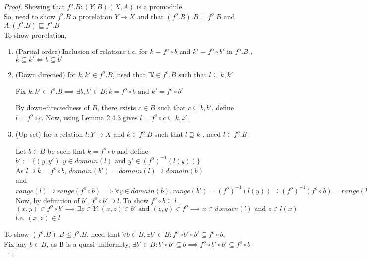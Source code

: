\documentclass[18pt,a4paper]{article}
\makeatletter
\theoremstyle{definition}
\newcommand{\carrow}{}%
\DeclareRobustCommand{\carrow}{%
	\mathrel{\vphantom{\rightarrow}\mathpalette\circle@arrow\relax}%
}
\newcommand{\circle@arrow}[2]{%
	\m@th
	\ooalign{%
		\hidewidth$#1\circ\mkern1mu$\hidewidth\cr
	$#1\longrightarrow$\cr}%
}
\makeatother
\begin{document}
\begin{proof}
Showing that $f^o .B: (Y,B) \carrow (X,A)$ is a promodule.\\
	So, need to show $f^o .B$ a prorelation $Y \to X$
	and that $(f^o .B).B \sqsubseteq f^o .B$ and $A.(f^o .B) \sqsubseteq f^o .B$ \\
	To show prorelation, \begin{enumerate}[label=(\roman*)]
		\item (Partial-order) Inclusion of relations i.e. for $k=f^o \circ b$ and
			$k'=f^o \circ b'$ in $f^o .B$ , $k \subseteq k' \iff b \subseteq b'$
		\item (Down directed) for $k,k' \in f^o .B$, need that $\exists l \in f^o .B
			\text{ such that } l \subseteq k,k'$

			Fix $k,k' \in f^o .B \implies \exists b,b' \in B : k=f^o \circ b \text{ and }
			k' = f^o \circ b'$

			By down-directedness of $B$, there exists $c \in B$ such that
			$ c \subseteq b,b'$, define $l=f^o \circ c$.
			Now, using Lemma 2.4.3 gives  $l= f^o \circ c \subseteq k,k'$.
		\item (Up-set) for a relation $l:Y \to X$ and $k \in f^o .B$ such that $l \supseteq k$
			, need $l \in f^o .B$

			Let $b\in B$ be such that $k=f^o \circ b$ and define
			$b':=\{(y,y'): y \in domain(l) \text{ and } y' \in (f^o)^{-1}(l(y))\}$\\
				As $l\supseteq k=f^o \circ b$, $domain(b')=domain(l)\supseteq domain(b)$
				\\ and $range(l) \supseteq range(f^o \circ b)\implies
				\forall y \in domain(b), range (b')=(f^o )^{-1}(l(y)) \supseteq (f^o)^{-1}(f^o \circ b ) = range(b)$\\
				Now, by definition of $b'$, $f^o \circ b' \supseteq l$. To show
				$f^o \circ b \subseteq l$ , \\
				$(x,y)\in f^o \circ b' \implies \exists z \in Y: (x,z)\in b' \text{ and }
				(z,y) \in f^o \implies x \in domain(l) \text{ and } z \in l(x)$ i.e.
				$(x,z) \in l$

		\end{enumerate}
	\item	To show $(f^o .B).B \leq f^o .B$, need that $\forall b \in B,
		\exists b' \in B : f^o \circ b' \circ b' \subseteq f^o \circ b$,\\
		Fix any $b \in B$, as B is a quasi-uniformity, $\exists b' \in B : b' \circ b' \subseteq b
		\implies f^o \circ b'\circ b' \subseteq f^o \circ b$


\end{proof}
\end{document}
